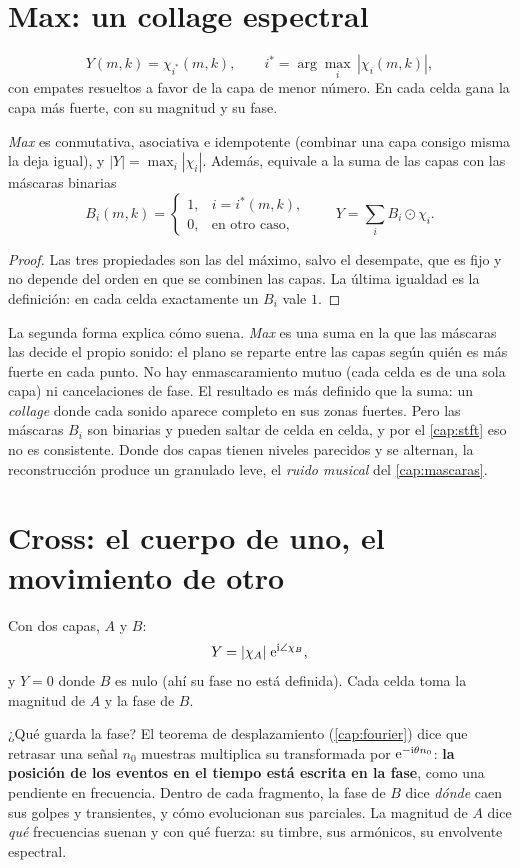 \section{Max: un collage espectral}

\[
  Y(m,k)=\chi_{i^*}(m,k),\qquad i^*=\arg\max_i\,|\chi_i(m,k)|,
\]
con empates resueltos a favor de la capa de menor número. En cada celda gana la capa más fuerte, con
su magnitud y su fase.

\begin{proposicion}
\emph{Max} es conmutativa, asociativa e idempotente (combinar una capa consigo misma la deja
igual), y $|Y|=\max_i|\chi_i|$. Además, equivale a la suma de las capas con las máscaras binarias
\[
  B_i(m,k)=\begin{cases}1,& i=i^*(m,k),\\ 0,&\text{en otro caso,}\end{cases}
  \qquad Y=\sum_i B_i\odot\chi_i .
\]
\end{proposicion}

\begin{proof}
Las tres propiedades son las del máximo, salvo el desempate, que es fijo y no depende del orden
en que se combinen las capas. La última igualdad es la definición: en cada celda exactamente un
$B_i$ vale $1$.
\end{proof}

La segunda forma explica cómo suena. \emph{Max} es una suma en la que las máscaras las decide el
propio sonido: el plano se reparte entre las capas según quién es más fuerte en cada punto. No hay
enmascaramiento mutuo (cada celda es de una sola capa) ni cancelaciones de fase. El resultado es
más definido que la suma: un \emph{collage} donde cada sonido aparece completo en sus zonas
fuertes. Pero las máscaras $B_i$ son binarias y pueden saltar de celda en celda, y por el
\cref{cap:stft} eso no es consistente. Donde dos capas tienen niveles parecidos y se alternan, la
reconstrucción produce un granulado leve, el \emph{ruido musical} del \cref{cap:mascaras}.

\section{Cross: el cuerpo de uno, el movimiento de otro}

Con dos capas, $A$ y $B$:
\[
  Y=|\chi_A|\;\mathrm{e}^{\mathrm{i}\angle\chi_B},
\]
y $Y=0$ donde $B$ es nulo (ahí su fase no está definida). Cada celda toma la magnitud de $A$ y la
fase de $B$.

¿Qué guarda la fase? El teorema de desplazamiento (\cref{cap:fourier}) dice que retrasar una señal
$n_0$ muestras multiplica su transformada por $\mathrm{e}^{-\mathrm{i}\theta n_0}$: \textbf{la posición de los
eventos en el tiempo está escrita en la fase}, como una pendiente en frecuencia. Dentro de cada
fragmento, la fase de $B$ dice \emph{dónde} caen sus golpes y transientes, y cómo evolucionan sus
parciales. La magnitud de $A$ dice \emph{qué} frecuencias suenan y con qué fuerza: su timbre, sus
armónicos, su envolvente espectral.

